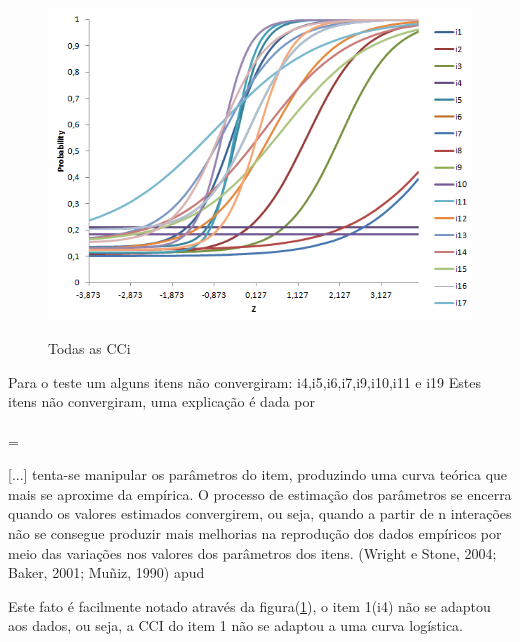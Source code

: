 	\paragraph{}
	\begin{figure}
	    \centering
	    \caption{Todas as CCi}
	    \includegraphics[width=0.5\linewidth]{img/all_cci}
	    \label{fig:all_cci}
	\end{figure}
	    
	Para o teste um alguns itens não convergiram:
	i4,i5,i6,i7,i9,i10,i11 e i19
    Estes itens não convergiram, uma explicação é dada por \textcite{Gleiber}\paragraph{}
   
			\newdimen\mylength
			\mylength = \linewidth
			\addtolength{\mylength}{-4.7cm}
			\hspace{4cm}\begin{minipage}{\mylength}
			    \linespread{1}
				\small{[...] tenta-se manipular os parâmetros do item, produzindo uma curva teórica que mais se aproxime da empírica. O processo de estimação dos parâmetros se encerra quando os valores estimados convergirem, ou seja, quando a partir de n interações não se consegue produzir mais melhorias na reprodução dos dados empíricos por meio das variações nos valores dos parâmetros dos itens. (Wright e Stone, 2004; Baker, 2001; Muñiz, 1990) apud \cite{Gleiber}}
				
			\end{minipage}
		Este fato é facilmente notado através da figura(\ref{fig:all_cci}), o item 1(i4) não se adaptou aos dados, ou seja, a CCI do item 1 não se adaptou a uma curva logística.
